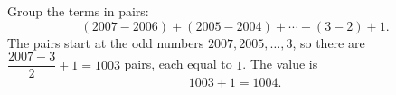 Group the terms in pairs:
\[(2007-2006)+(2005-2004)+\cdots+(3-2)+1 .\]
The pairs start at the odd numbers $2007,2005,\dots,3$, so there are $\dfrac{2007-3}{2}+1=1003$ pairs, each equal to $1$. The value is
\[1003+1=\boxed{1004}.\]
